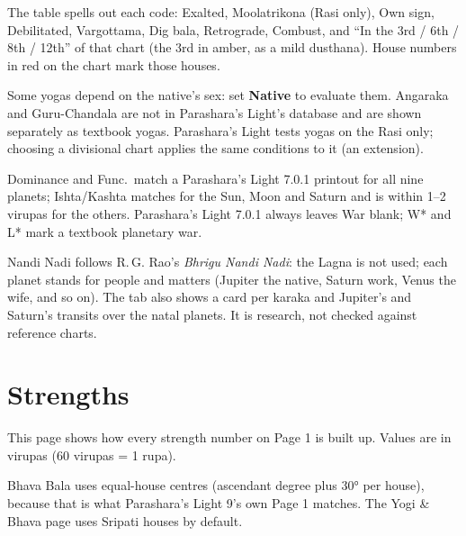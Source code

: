 \documentclass[11pt, a4paper]{article}
\newcommand{\shot}[1]{}
\newcommand{\PL}{Parashara's Light}
\newcommand{\ui}[1]{\textbf{\textsf{#1}}}   %
\begin{document}
\shot{exstates}

The table spells out each code: Exalted, Moolatrikona (Rasi only), Own sign, Debilitated, Vargottama,
Dig bala, Retrograde, Combust, and ``In the 3rd / 6th / 8th / 12th'' of that chart (the 3rd in amber, as a
mild dusthana). House numbers in red on the chart mark those houses.

\shot{exconj}
\shot{exacross}
\shot{exlords}
\shot{exyogas}

\begin{notebox}Some yogas depend on the native's sex: set \ui{Native} to evaluate them. Angaraka and
Guru-Chandala are not in \PL{}'s database and are shown separately as textbook yogas. \PL{} tests yogas on
the Rasi only; choosing a divisional chart applies the same conditions to it (an extension).\end{notebox}

\shot{exmatrix}
\shot{exhouses}
\shot{exws14}

Dominance and Func.\ match a \PL{} 7.0.1 printout for all nine planets; Ishta/Kashta matches for the Sun,
Moon and Saturn and is within 1--2 virupas for the others. \PL{} 7.0.1 always leaves War blank; W* and L*
mark a textbook planetary war.

\shot{exnadi}

Nandi Nadi follows R.\,G. Rao's \emph{Bhrigu Nandi Nadi}: the Lagna is not used; each planet stands for
people and matters (Jupiter the native, Saturn work, Venus the wife, and so on). The tab also shows a card
per karaka and Jupiter's and Saturn's transits over the natal planets. It is research, not checked against
reference charts.

\section{Strengths}
\label{sec:strengths}
This page shows how every strength number on Page 1 is built up. Values are in virupas (60 virupas = 1 rupa).

\shot{stsb}
\shot{stbb}

Bhava Bala uses equal-house centres (ascendant degree plus 30° per house), because that is what \PL{} 9's
own Page 1 matches. The Yogi \& Bhava page uses Sripati houses by default.

\shot{sttime}
\shot{stav}

\end{document}
